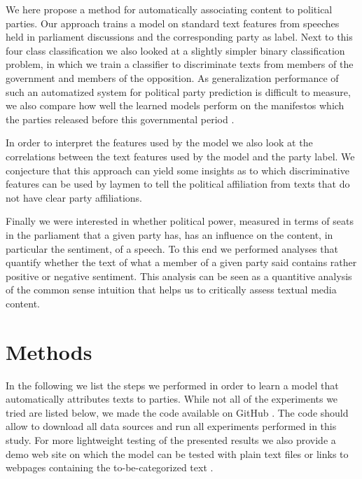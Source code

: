 \documentclass{article} %
\begin{document}
We here propose a method for automatically associating content to political parties. Our approach trains a model on standard text features from speeches held in parliament discussions \cite{plenarprotokolle} and the corresponding party as label. Next to this four class classification we also looked at a slightly simpler binary classification problem, in which we train a classifier to discriminate texts from members of the government and members of the opposition. 
As generalization performance of such an automatized system for political party prediction is difficult to measure, we also compare how well the learned models perform on the manifestos which the parties released before this governmental period \cite{linke_parteiprogramm, gruene_parteiprogramm,spd_parteiprogramm, cdu_parteiprogramm}. 

In order to interpret the features used by the model we also look at the correlations between the text features used by the model and the party label. We conjecture that this approach can yield some insights as to which discriminative features can be used by laymen to tell the political affiliation from texts that do not have clear party affiliations. 

Finally we were interested in whether political power, measured in terms of seats in the parliament that a given party has, has an influence on the content, in particular the sentiment, of a speech. To this end we performed analyses that quantify whether the text of what a member of a given party said contains rather positive or negative sentiment. This analysis can be seen as a quantitive analysis of the common sense intuition that helps us to critically assess textual media content. 

\section{Methods}

In the following we list the steps we performed in order to learn a model that automatically attributes texts to parties. While not all of the experiments we tried are listed below, we made the code available on GitHub \cite{linksrechts_code}. The code should allow to download all data sources and run all experiments performed in this study. For more lightweight testing of the presented results we also provide a demo web site on which the model can be tested with plain text files or links to webpages containing the to-be-categorized text \cite{linksrechts}. 
\end{document}
